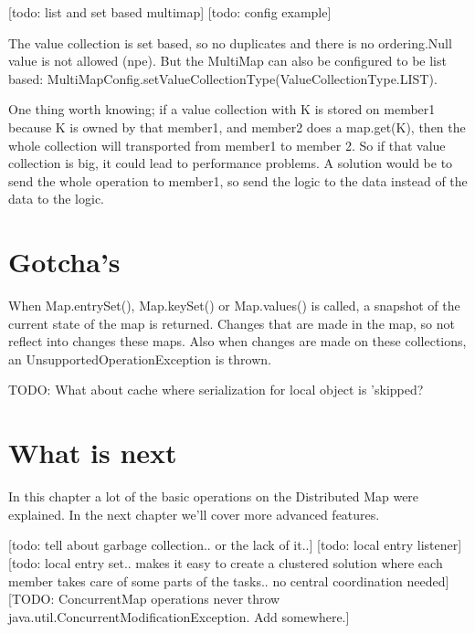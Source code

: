 [todo: list and set based multimap]
[todo: config example]

The value collection is set based, so no duplicates and there is no ordering.Null value is not allowed (npe). But the MultiMap can also be configured to be list based: MultiMapConfig.setValueCollectionType(ValueCollectionType.LIST). 

One thing worth knowing; if a value collection with K is stored on member1 because K is owned by that member1, and member2 does a map.get(K), then the whole collection will transported from member1 to member 2. So if that value collection is big, it could lead to performance problems. A solution would be to send the whole operation to member1, so send the logic to the data instead of the data to the logic.

\section{Gotcha's}
When Map.entrySet(), Map.keySet() or Map.values() is called, a snapshot of the current state of the map is returned. Changes that are made in the map, so not reflect into changes these maps. Also when changes are made on these collections, an UnsupportedOperationException is thrown.

TODO: What about cache where serialization for local object is 'skipped?

\section{What is next}
In this chapter a lot of the basic operations on the Distributed Map were explained. In the next chapter we'll cover more advanced features.

[todo: tell about garbage collection.. or the lack of it..]
[todo: local entry listener]
[todo: local entry set.. makes it easy to create a clustered solution where each member takes care of some parts of the tasks.. no central coordination needed]
[TODO: ConcurrentMap operations never throw java.util.ConcurrentModificationException. Add somewhere.]


